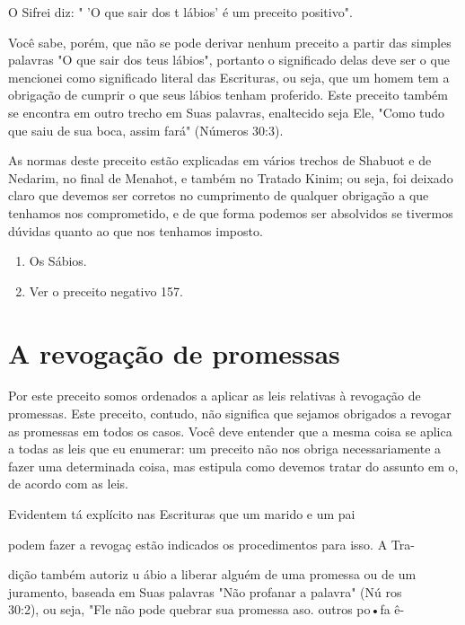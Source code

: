\begin{itemize}
\begin{enumrate}
\begin{itemize}
\begin{itemize}
O Sifrei diz: " 'O que sair dos t lábios' é um preceito positivo".

Você sabe, porém, que não se pode derivar nenhum preceito a partir das
sim­ples palavras "O que sair dos teus lábios", portanto o significado
delas deve ser o que mencionei como significado literal das Escrituras,
ou seja, que um homem tem a obrigação de cumprir o que seus lábios
tenham proferido. Este preceito também se encontra em outro trecho em
Suas palavras, enaltecido se­ja Ele, "Como tudo que saiu de sua boca,
assim fará" (Números 30:3).

As normas deste preceito estão explicadas em vários trechos de Sha­buot
e de Nedarim, no final de Menahot, e também no Tratado Kinim; ou seja,
foi deixado claro que devemos ser corretos no cumprimento de qualquer
obri­gação a que tenhamos nos comprometido, e de que forma podemos ser
absol­vidos se tivermos dúvidas quanto ao que nos tenhamos imposto.


\begin{enumerate}
\def\labelenumi{\arabic{enumi}.}
\setcounter{enumi}{126}
\item
 
 Os Sábios.
 
\item
 
 Ver o preceito negativo 157.
 
\end{enumerate}




\section{A revogação de promessas}

Por este preceito somos ordenados a aplicar as leis relativas à
revo­gação de promessas. Este preceito, contudo, não significa que
sejamos obriga­dos a revogar as promessas em todos os casos. Você deve
entender que a mes­ma coisa se aplica a todas as leis que eu enumerar:
um preceito não nos obriga necessariamente a fazer uma determinada
coisa, mas estipula como devemos tratar do assunto em o, de acordo com
as leis.

Evidentem tá explícito nas Escrituras que um marido e um pai

podem fazer a revogaç estão indicados os procedimentos para isso. A Tra-

dição também autoriz u ábio a liberar alguém de uma promessa ou de um\\
juramento, baseada em Suas palavras "Não profanar a palavra" (Nú ros\\
30:2), ou seja, "Fle não pode quebrar sua promessa aso. outros po•fa ê-


\end{itemize}
\end{itemize}
\end{enumrate}
\end{itemize}
